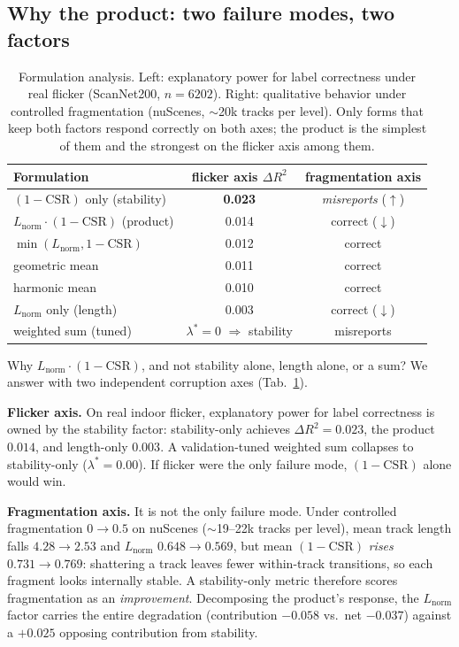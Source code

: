 \documentclass[10pt,twocolumn,letterpaper]{article}
\newcommand{\csr}{\mathrm{CSR}}
\newcommand{\lnorm}{L_{\mathrm{norm}}}
\begin{document}
\subsection{Why the product: two failure modes, two factors}
\label{sec:product}

\begin{table}[t]
\centering\small
\begin{tabular}{lcc}
\toprule
Formulation & flicker axis $\Delta R^2$ & fragmentation axis \\
\midrule
$(1-\csr)$ only (stability) & \textbf{0.023} & \emph{misreports} ($\uparrow$) \\
$\lnorm\cdot(1-\csr)$ (product) & 0.014 & correct ($\downarrow$) \\
$\min(\lnorm, 1-\csr)$ & 0.012 & correct \\
geometric mean & 0.011 & correct \\
harmonic mean & 0.010 & correct \\
$\lnorm$ only (length) & 0.003 & correct ($\downarrow$) \\
weighted sum (tuned) & $\lambda^*{=}0$ $\Rightarrow$ stability & misreports \\
\bottomrule
\end{tabular}
\caption{Formulation analysis. Left: explanatory power for label correctness
under real flicker (ScanNet200, $n{=}6202$). Right: qualitative behavior
under controlled fragmentation (nuScenes, $\sim$20k tracks per level). Only
forms that keep both factors respond correctly on both axes; the product is
the simplest of them and the strongest on the flicker axis among them.}
\label{tab:formulation}
\end{table}

Why $\lnorm\cdot(1-\csr)$, and not stability alone, length alone, or a sum?
We answer with two independent corruption axes (Tab.~\ref{tab:formulation}).

\noindent\textbf{Flicker axis.} On real indoor flicker, explanatory power for
label correctness is owned by the stability factor: stability-only achieves
$\Delta R^2{=}0.023$, the product $0.014$, and length-only $0.003$. A
validation-tuned weighted sum collapses to stability-only
($\lambda^*{=}0.00$). If flicker were the only failure mode, $(1-\csr)$ alone
would win.

\noindent\textbf{Fragmentation axis.} It is not the only failure mode. Under
controlled fragmentation $0\!\to\!0.5$ on nuScenes ($\sim$19--22k tracks per
level), mean track length falls $4.28\!\to\!2.53$ and $\lnorm$
$0.648\!\to\!0.569$, but mean $(1-\csr)$ \emph{rises} $0.731\!\to\!0.769$:
shattering a track leaves fewer within-track transitions, so each fragment
looks internally stable. A stability-only metric therefore scores
fragmentation as an \emph{improvement}. Decomposing the product's response,
the $\lnorm$ factor carries the entire degradation (contribution $-0.058$
vs.\ net $-0.037$) against a $+0.025$ opposing contribution from stability.
\end{document}
